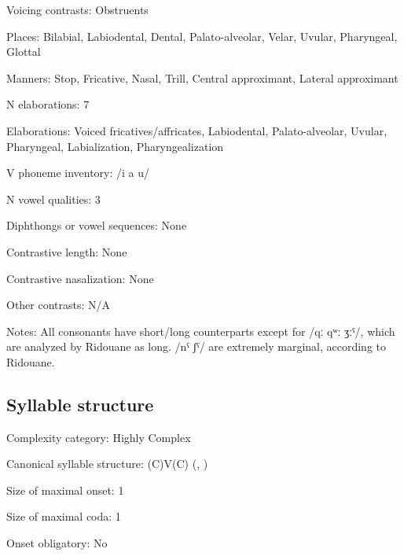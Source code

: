 {\begin{appendixdesc}
\item[Voicing contrasts:] Obstruents

\item[Places:] Bilabial, Labiodental, Dental, Palato-alveolar, Velar, Uvular, Pharyngeal, Glottal

\item[Manners:] Stop, Fricative, Nasal, Trill, Central approximant, Lateral approximant

\item[N elaborations:] 7

\item[Elaborations:] Voiced fricatives/affricates, Labiodental, Palato-alveolar, Uvular, Pharyngeal, Labialization, Pharyngealization

\item[V phoneme inventory:] /i a u/

\item[N vowel qualities:] 3

\item[Diphthongs or vowel sequences:] None

\item[Contrastive length:] None

\item[Contrastive nasalization:] None

\item[Other contrasts:] N/A

\item[Notes:] All consonants have short/long counterparts except for /qː qʷː ʒːˤ/, which are analyzed by Ridouane as long. /nˤ ʃˤ/ are extremely marginal, according to Ridouane.
\end{appendixdesc}
\subsection*{Syllable structure}
\begin{appendixdesc}

\item[Complexity category:] Highly Complex

\item[Canonical syllable structure:] (C)V(C) (\citealt{DellElmedlaoui2002}, \citealt{Ridouane2008})

\item[Size of maximal onset:] 1

\item[Size of maximal coda:] 1

\item[Onset obligatory:] No


\end{appendixdesc}}
